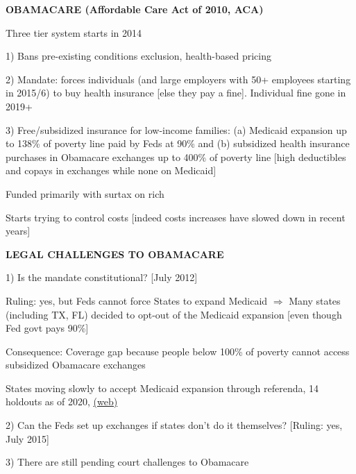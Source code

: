 \documentclass[landscape]{slides}
\begin{document}
%

\begin{slide}
\begin{center}
{\bf OBAMACARE (Affordable Care Act of 2010, ACA)}
\end{center}
Three tier system starts in 2014 %

1) Bans pre-existing conditions exclusion, health-based pricing

2) Mandate: forces individuals (and large employers with 50+ employees starting in 2015/6) 
to buy health insurance [else they pay a fine]. Individual fine gone in 2019+

3) Free/subsidized insurance for low-income families: (a) Medicaid expansion up to 138\% of poverty line paid by Feds at 90\% and (b)
subsidized health insurance purchases in Obamacare exchanges up to 400\% of poverty line [high deductibles and copays
in exchanges while none on Medicaid]

Funded primarily with surtax on rich

Starts trying to control costs [indeed costs increases have slowed down in recent years]


\end{slide}


\begin{slide}

\end{slide}


\begin{slide}
\begin{center}
{\bf LEGAL CHALLENGES TO OBAMACARE}
\end{center}
1) Is the mandate constitutional? [July 2012]

Ruling: yes, but Feds cannot force States to expand Medicaid $\Rightarrow$ Many states (including TX, FL) decided to opt-out of the Medicaid expansion [even though Fed govt pays 90\%]

Consequence: Coverage gap because people below 100\% of poverty cannot access subsidized Obamacare exchanges

States moving slowly to accept Medicaid expansion through referenda, 14 holdouts as of 2020,
\href{https://www.kff.org/medicaid/issue-brief/status-of-state-medicaid-expansion-decisions-interactive-map/}{(web)} 


2) Can the Feds set up exchanges if states don't do it themselves? [Ruling: yes, July 2015]


3) There are still pending court challenges to Obamacare 

\end{slide}
\end{document}

